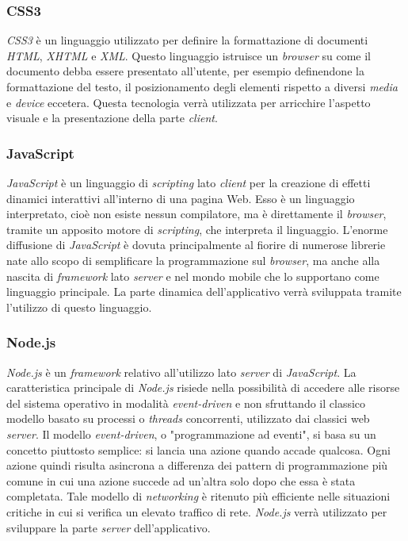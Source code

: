 \subsubsection{CSS3}
\textit{CSS3} è un linguaggio utilizzato per definire la formattazione di documenti \textit{HTML}, \textit{XHTML} e \textit{XML}.
Questo linguaggio istruisce un \textit{browser} su come il documento debba essere presentato all'utente, per esempio definendone la formattazione del testo, il posizionamento degli elementi rispetto a diversi \textit{media} e \textit{device} eccetera.
Questa tecnologia verrà utilizzata per arricchire l'aspetto visuale e la presentazione della parte \textit{client}.

\subsubsection{JavaScript}
\textit{JavaScript} è un linguaggio di \textit{scripting} lato \textit{client} per la creazione di effetti dinamici interattivi all'interno di una pagina Web. Esso è un linguaggio interpretato, cioè non esiste nessun compilatore, ma è direttamente il \textit{browser}, tramite un apposito motore di \textit{scripting}, che interpreta il linguaggio.
L'enorme diffusione di \textit{JavaScript} è dovuta principalmente al fiorire di numerose librerie nate allo scopo di semplificare la programmazione sul \textit{browser}, ma anche alla nascita di \textit{framework} lato \textit{server} e nel mondo mobile che lo supportano come linguaggio principale.
La parte dinamica dell'applicativo verrà sviluppata tramite l'utilizzo di questo linguaggio.

\subsubsection{Node.js}
\textit{Node.js} è un \textit{framework} relativo all'utilizzo lato \textit{server} di \textit{JavaScript}.
La caratteristica principale di \textit{Node.js} risiede nella possibilità di accedere alle risorse del sistema operativo in modalità \textit{event-driven} e non sfruttando il classico modello basato su processi o \textit{threads} concorrenti, utilizzato dai classici web \textit{server}.
Il modello \textit{event-driven}, o "programmazione ad eventi", si basa su un concetto piuttosto semplice: si lancia una azione quando accade qualcosa. Ogni azione quindi risulta asincrona a differenza dei pattern di programmazione più comune in cui una azione succede ad un'altra solo dopo che essa è stata completata.
Tale modello di \textit{networking} è ritenuto più efficiente nelle situazioni critiche in cui si verifica un elevato traffico di rete.
\textit{Node.js} verrà utilizzato per sviluppare la parte \textit{server} dell'applicativo.
